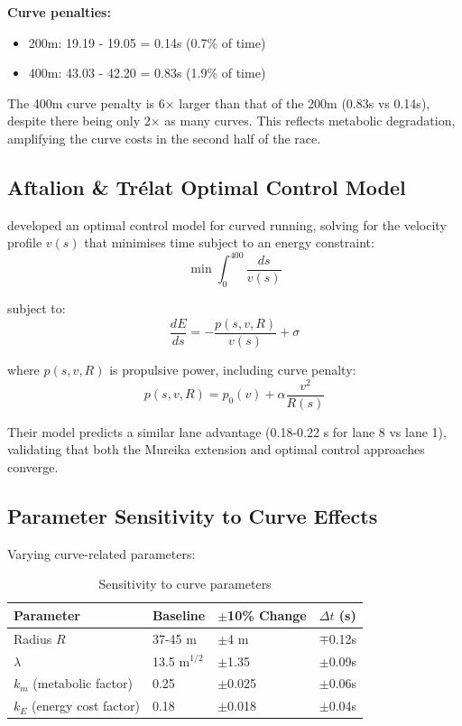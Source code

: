 \textbf{Curve penalties:}
\begin{itemize}
    \item 200m: 19.19 - 19.05 = 0.14s (0.7\% of time)
    \item 400m: 43.03 - 42.20 = 0.83s (1.9\% of time)
\end{itemize}

The 400m curve penalty is 6× larger than that of the 200m (0.83s vs 0.14s), despite there being only 2× as many curves. This reflects metabolic degradation, amplifying the curve costs in the second half of the race.

\subsection{Aftalion \& Trélat Optimal Control Model}

\citet{Aftalion2020} developed an optimal control model for curved running, solving for the velocity profile $v(s)$ that minimises time subject to an energy constraint:
\begin{equation}
\min \int_0^{400} \frac{ds}{v(s)}
\end{equation}

subject to:
\begin{equation}
\frac{dE}{ds} = -\frac{p(s,v,R)}{v(s)} + \sigma
\end{equation}

where $p(s,v,R)$ is propulsive power, including curve penalty:
\begin{equation}
p(s,v,R) = p_0(v) + \alpha \frac{v^2}{R(s)}
\end{equation}

Their model predicts a similar lane advantage (0.18-0.22 s for lane 8 vs lane 1), validating that both the Mureika extension and optimal control approaches converge.

\subsection{Parameter Sensitivity to Curve Effects}

Varying curve-related parameters:

\begin{table}[H]
\centering
\caption{Sensitivity to curve parameters}
\begin{tabular}{@{}llll@{}}
\toprule
\textbf{Parameter} & \textbf{Baseline} & \textbf{$\pm$10\% Change} & \textbf{$\Delta t$ (s)} \\
\midrule
Radius $R$ & 37-45 m & $\pm$4 m & $\mp$0.12s \\
$\lambda$ & 13.5 m$^{1/2}$ & $\pm$1.35 & $\pm$0.09s \\
$k_m$ (metabolic factor) & 0.25 & $\pm$0.025 & $\pm$0.06s \\
$k_E$ (energy cost factor) & 0.18 & $\pm$0.018 & $\pm$0.04s \\
\bottomrule
\end{tabular}
\end{table}

